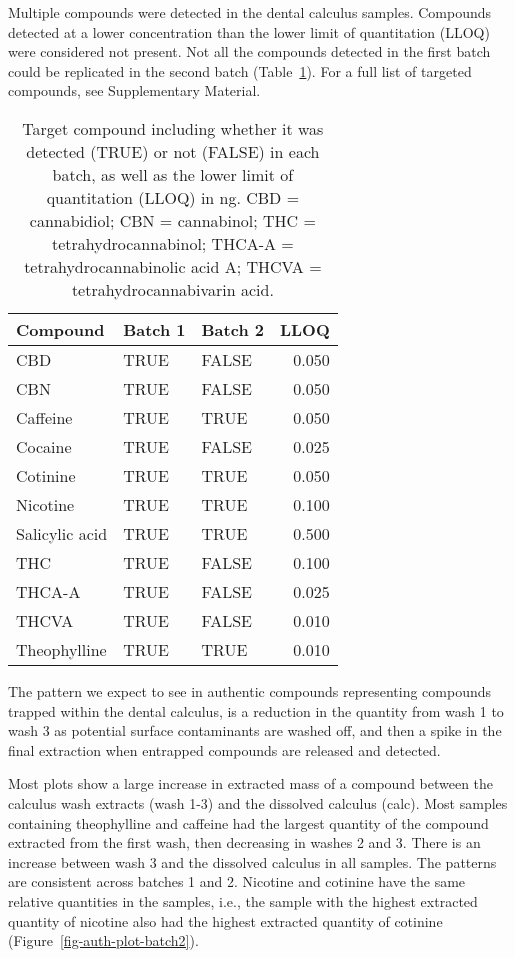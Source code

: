 \documentclass[
  11pt,
  leqno]{scrartcl}
\begin{document}
Multiple compounds were detected in the dental calculus samples.
Compounds detected at a lower concentration than the lower limit of
quantitation (LLOQ) were considered not present. Not all the compounds
detected in the first batch could be replicated in the second batch
(Table~\ref{tbl-compound-detect}). For a full list of targeted
compounds, see Supplementary Material.

\begin{longtable}[]{@{}lllr@{}}

\caption{\label{tbl-compound-detect}Target compound including whether it
was detected (TRUE) or not (FALSE) in each batch, as well as the lower
limit of quantitation (LLOQ) in ng. CBD = cannabidiol; CBN = cannabinol;
THC = tetrahydrocannabinol; THCA-A = tetrahydrocannabinolic acid A;
THCVA = tetrahydrocannabivarin acid.}

\tabularnewline

\toprule\noalign{}
Compound & Batch 1 & Batch 2 & LLOQ \\
\midrule\noalign{}
\endhead
\bottomrule\noalign{}
\endlastfoot
CBD & TRUE & FALSE & 0.050 \\
CBN & TRUE & FALSE & 0.050 \\
Caffeine & TRUE & TRUE & 0.050 \\
Cocaine & TRUE & FALSE & 0.025 \\
Cotinine & TRUE & TRUE & 0.050 \\
Nicotine & TRUE & TRUE & 0.100 \\
Salicylic acid & TRUE & TRUE & 0.500 \\
THC & TRUE & FALSE & 0.100 \\
THCA-A & TRUE & FALSE & 0.025 \\
THCVA & TRUE & FALSE & 0.010 \\
Theophylline & TRUE & TRUE & 0.010 \\

\end{longtable}

The pattern we expect to see in authentic compounds representing
compounds trapped within the dental calculus, is a reduction in the
quantity from wash 1 to wash 3 as potential surface contaminants are
washed off, and then a spike in the final extraction when entrapped
compounds are released and detected.

Most plots show a large increase in extracted mass of a compound between
the calculus wash extracts (wash 1-3) and the dissolved calculus (calc).
Most samples containing theophylline and caffeine had the largest
quantity of the compound extracted from the first wash, then decreasing
in washes 2 and 3. There is an increase between wash 3 and the dissolved
calculus in all samples. The patterns are consistent across batches 1
and 2. Nicotine and cotinine have the same relative quantities in the
samples, i.e., the sample with the highest extracted quantity of
nicotine also had the highest extracted quantity of cotinine
(Figure~\ref{fig-auth-plot-batch2}).
\end{document}
